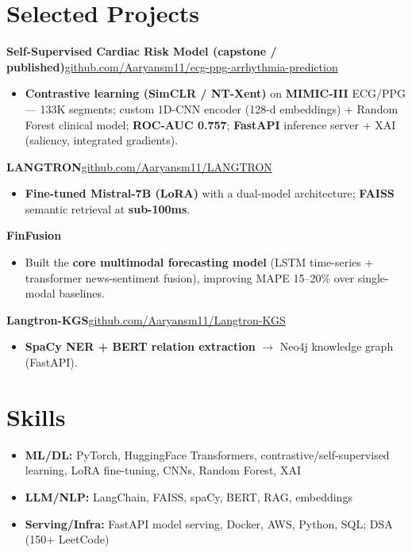 \documentclass[10pt,a4paper]{article}
\begin{document}
\section*{Selected Projects}
\vspace{1pt}\textbf{Self-Supervised Cardiac Risk Model (capstone / published)}\hfill {\small\href{https://github.com/Aaryansm11/ecg-ppg-arrhythmia-prediction}{github.com/Aaryansm11/ecg-ppg-arrhythmia-prediction}}
\begin{itemize}
\item \textbf{Contrastive learning (SimCLR / NT-Xent)} on \textbf{MIMIC-III} ECG/PPG --- 133K segments; custom 1D-CNN encoder (128-d embeddings) + Random Forest clinical model; \textbf{ROC-AUC 0.757}; \textbf{FastAPI} inference server + XAI (saliency, integrated gradients).
\end{itemize}
\vspace{1pt}\textbf{LANGTRON}\hfill {\small\href{https://github.com/Aaryansm11/LANGTRON}{github.com/Aaryansm11/LANGTRON}}
\begin{itemize}
\item \textbf{Fine-tuned Mistral-7B (LoRA)} with a dual-model architecture; \textbf{FAISS} semantic retrieval at \textbf{sub-100ms}.
\end{itemize}
\vspace{1pt}\textbf{FinFusion}
\begin{itemize}
\item Built the \textbf{core multimodal forecasting model} (LSTM time-series + transformer news-sentiment fusion), improving MAPE 15--20\% over single-modal baselines.
\end{itemize}
\vspace{1pt}\textbf{Langtron-KGS}\hfill {\small\href{https://github.com/Aaryansm11/Langtron-KGS}{github.com/Aaryansm11/Langtron-KGS}}
\begin{itemize}
\item \textbf{SpaCy NER + BERT relation extraction} $\rightarrow$ Neo4j knowledge graph (FastAPI).
\end{itemize}
\section*{Skills}
\begin{itemize}
\item \textbf{ML/DL:} PyTorch, HuggingFace Transformers, contrastive/self-supervised learning, LoRA fine-tuning, CNNs, Random Forest, XAI
\item \textbf{LLM/NLP:} LangChain, FAISS, spaCy, BERT, RAG, embeddings
\item \textbf{Serving/Infra:} FastAPI model serving, Docker, AWS, Python, SQL; DSA (150+ LeetCode)
\end{itemize}
\end{document}
